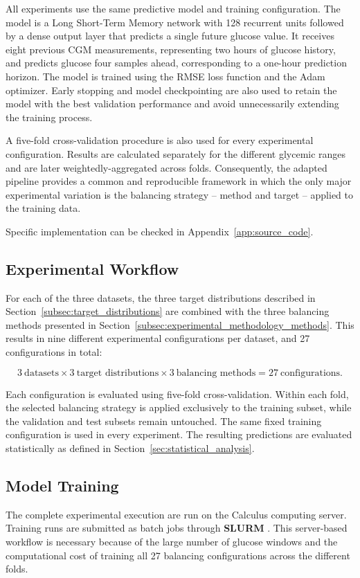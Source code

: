 All experiments use the same predictive model and training configuration. The model is a Long Short-Term Memory network with 128 recurrent units followed by a dense output layer that predicts a single future glucose value. It receives eight previous CGM measurements, representing two hours of glucose history, and predicts glucose four samples ahead, corresponding to a one-hour prediction horizon. The model is trained using the RMSE loss function and the Adam optimizer. Early stopping and model checkpointing are also used to retain the model with the best validation performance and avoid unnecessarily extending the training process.

A five-fold cross-validation procedure is also used for every experimental configuration. Results are calculated separately for the different glycemic ranges and are later weightedly-aggregated across folds. Consequently, the adapted pipeline provides a common and reproducible framework in which the only major experimental variation is the balancing strategy -- method and target -- applied to the training data.

Specific implementation can be checked in Appendix~\ref{app:source_code}.

\subsection{Experimental Workflow}
\label{subsec:experimental_workflow}

For each of the three datasets, the three target distributions described in Section~\ref{subsec:target_distributions} are combined with the three balancing methods presented in Section~\ref{subsec:experimental_methodology_methods}. This results in nine different experimental configurations per dataset, and 27 configurations in total:

\[
3\ \text{datasets}
\times
3\ \text{target distributions}
\times
3\ \text{balancing methods}
=
27\ \text{configurations}.
\]

Each configuration is evaluated using five-fold cross-validation. Within each fold, the selected balancing strategy is applied exclusively to the training subset, while the validation and test subsets remain untouched. The same fixed training configuration is used in every experiment. The resulting predictions are evaluated statistically as defined in Section~\ref{sec:statistical_analysis}.

\subsection{Model Training}
\label{sec:model_training}

The complete experimental execution are run on the Calculus computing server. Training runs are submitted as batch jobs through \textbf{SLURM} \cite{slurm_documentation}. This server-based workflow is necessary because of the large number of glucose windows and the computational cost of training all 27 balancing configurations across the different folds.